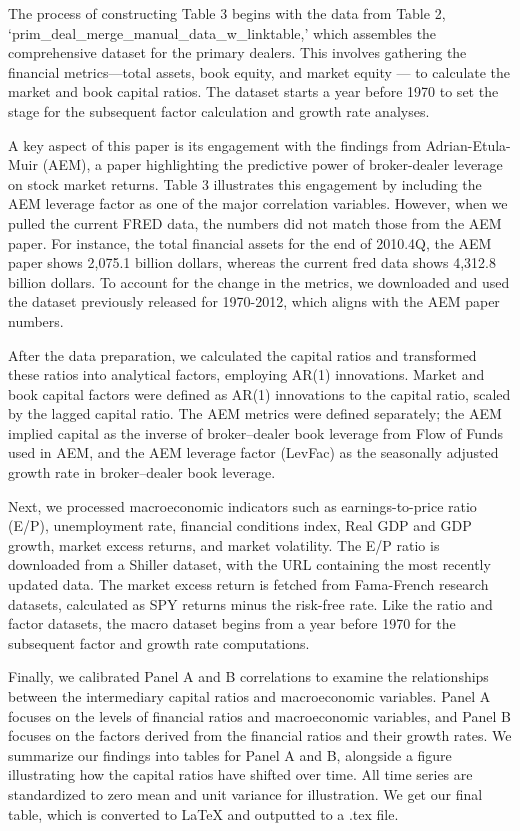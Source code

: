 \documentclass{article}
\begin{document}
The process of constructing Table 3 begins with the data from Table 2, `prim\_deal\_merge\_manual\_data\_w\_linktable,' which assembles the comprehensive dataset for the primary dealers. This involves gathering the financial metrics—total assets, book equity, and market equity — to calculate the market and book capital ratios.  The dataset starts a year before 1970 to set the stage for the subsequent factor calculation and growth rate analyses.

A key aspect of this paper is its engagement with the findings from Adrian-Etula-Muir (AEM), a paper highlighting the predictive power of broker-dealer leverage on stock market returns. Table 3 illustrates this engagement by including the AEM leverage factor as one of the major correlation variables. However, when we pulled the current FRED data, the numbers did not match those from the AEM paper. For instance, the total financial assets for the end of 2010.4Q, the AEM paper shows 2,075.1 billion dollars, whereas the current fred data shows 4,312.8 billion dollars. To account for the change in the metrics, we downloaded and used the dataset previously released for 1970-2012, which aligns with the AEM paper numbers.

After the data preparation, we calculated the capital ratios and transformed these ratios into analytical factors, employing AR(1) innovations. Market and book capital factors were defined as AR(1) innovations to the capital ratio, scaled by the lagged capital ratio. The AEM metrics were defined separately; the AEM implied capital as the inverse of broker–dealer book leverage from Flow of Funds used in AEM, and the AEM leverage factor (LevFac) as the seasonally adjusted growth rate in broker–dealer book leverage.

Next, we processed macroeconomic indicators such as earnings-to-price ratio (E/P), unemployment rate, financial conditions index, Real GDP and GDP growth, market excess returns, and market volatility. The E/P ratio is downloaded from a Shiller dataset, with the URL containing the most recently updated data. The market excess return is fetched from Fama-French research datasets, calculated as SPY returns minus the risk-free rate. Like the ratio and factor datasets, the macro dataset begins from a year before 1970 for the subsequent factor and growth rate computations.

Finally, we calibrated Panel A and B correlations to examine the relationships between the intermediary capital ratios and macroeconomic variables. Panel A focuses on the levels of financial ratios and macroeconomic variables, and Panel B focuses on the factors derived from the financial ratios and their growth rates. We summarize our findings into tables for Panel A and B, alongside a figure illustrating how the capital ratios have shifted over time. All time series are standardized to zero mean and unit variance for illustration. We get our final table, which is converted to LaTeX and outputted to a .tex file.
\end{document}
